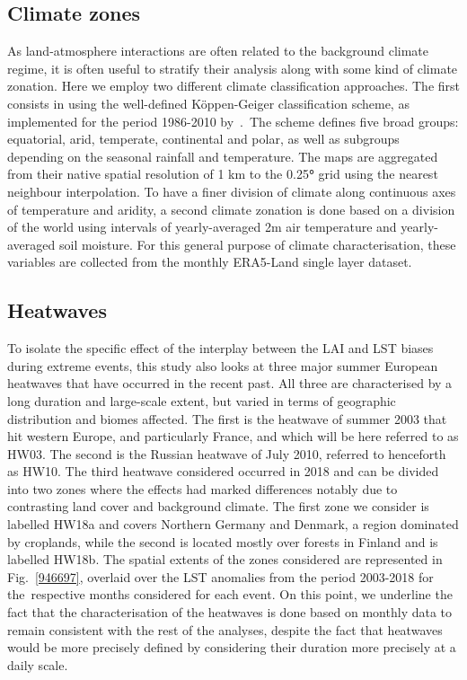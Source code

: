 \documentclass[gmd, manuscript]{copernicus}
\begin{document}
\subsection{Climate zones}

As land-atmosphere interactions are often related to the background
climate regime, it is often useful to stratify their analysis along with
some kind of climate zonation. Here we employ two different climate
classification approaches. The first consists in using the well-defined
Köppen-Geiger classification scheme, as implemented for the period
1986-2010 by~\citep{Kottek_2006}.~The scheme defines five broad groups:
equatorial, arid, temperate, continental and polar, as well as subgroups
depending on the seasonal rainfall and temperature. The maps are
aggregated from their native spatial resolution of 1 km to the
0.25\textbf{°} grid using the nearest neighbour interpolation. To have
a finer division of climate along continuous axes of temperature and
aridity, a second climate zonation is done based on a division of the
world using intervals of yearly-averaged 2m air temperature and
yearly-averaged soil moisture. For this general purpose of climate
characterisation, these variables are collected from the monthly
ERA5-Land single layer dataset.~


\subsection{Heatwaves}

To isolate the specific effect of the interplay between the LAI and LST
biases during extreme events, this study also looks at three major
summer European heatwaves that have occurred in the recent past. All
three are characterised by a long duration and large-scale extent, but
varied in terms of geographic distribution and biomes affected. The
first is the heatwave of summer 2003 that hit western Europe, and
particularly France, and which will be here referred to as HW03. The
second is the Russian heatwave of July 2010, referred to henceforth as
HW10. The third heatwave considered occurred in 2018 and can be divided
into two zones where the effects had marked differences notably due to
contrasting land cover and background climate. The first zone we
consider is labelled HW18a and covers Northern Germany and Denmark, a
region dominated by croplands, while the second is located mostly over
forests in Finland and is labelled HW18b. The spatial extents of the
zones considered are represented in
Fig.~{\ref{946697}}, overlaid over the LST anomalies
from the period 2003-2018 for the~respective months considered for each
event. On this point, we underline the fact that the characterisation of
the heatwaves is done based on monthly data to remain consistent with
the rest of the analyses, despite the fact that heatwaves would be more
precisely defined by considering their duration more precisely at a
daily scale.
\end{document}
